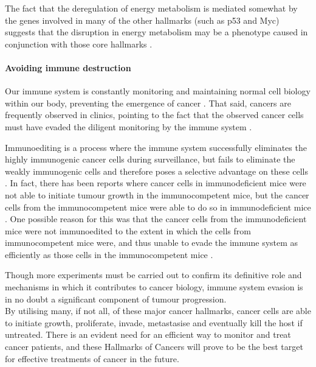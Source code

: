 The fact that the deregulation of energy metabolism is mediated somewhat by the genes involved in many of the other hallmarks (such as p53 and Myc) suggests that the disruption in energy metabolism may be a phenotype caused in conjunction with those core hallmarks \citep{Hanahan2011}.

\paragraph{Avoiding immune destruction}

\noindent
Our immune system is constantly monitoring and maintaining normal cell biology within our body, preventing the emergence of cancer \citep{Hanahan2011}.
That said, cancers are frequently observed in clinics, pointing to the fact that the observed cancer cells must have evaded the diligent monitoring by the immune system \citep{Hanahan2011}.

Immunoediting is a process where the immune system successfully eliminates the highly immunogenic cancer cells during surveillance, but fails to eliminate the weakly immunogenic cells and therefore poses a selective advantage on these cells \citep{Hanahan2011,Teng2008}.
In fact, there has been reports where cancer cells in immunodeficient mice were not able to initiate tumour growth in the immunocompetent mice, but the cancer cells from the immunocompetent mice were able to do so in immunodeficient mice \citep{Hanahan2011}.
One possible reason for this was that the cancer cells from the immunodeficient mice were not immunoedited to the extent in which the cells from immunocompetent mice were, and thus unable to evade the immune system as efficiently as those cells in the immunocompetent mice \citep{Hanahan2011}.

Though more experiments must be carried out to confirm its definitive role and mechanisms in which it contributes to cancer biology, immune system evasion is in no doubt a significant component of tumour progression. \\

\noindent
By utilising many, if not all, of these major cancer hallmarks, cancer cells are able to initiate growth, proliferate, invade, metastasise and eventually kill the host if untreated.
There is an evident need for an efficient way to monitor and treat cancer patients, and these Hallmarks of Cancers will prove to be the best target for effective treatments of cancer in the future.


